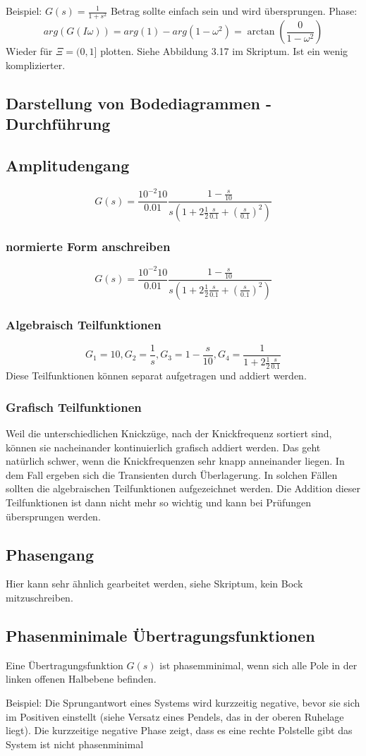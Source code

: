 \documentclass[a4paper]{article}
\begin{document}
Beispiel: $G(s)=\frac{1}{1+s^{2}}$ 
Betrag sollte einfach sein und wird übersprungen.
Phase:
\[ arg(G(I\omega))=arg(1)-arg(1-\omega^{2})=\arctan(\frac{0}{1-\omega^{2}}) \]
Wieder für $\Xi=(0, 1]$ plotten. Siehe Abbildung 3.17 im Skriptum. Ist ein wenig komplizierter.

\subsection*{Darstellung von Bodediagrammen - Durchführung}
\subsection*{Amplitudengang}
\[ G(s)=\frac{10^{-2} 10}{0.01} \frac{1-\frac{s}{10}}{s(1+2 \frac{1}{2} \frac{s}{0.1}+(\frac{s}{0.1})^{2})}\]

\subsubsection*{normierte Form anschreiben}
\[ G(s)=\frac{10^{-2} 10}{0.01} \frac{1-\frac{s}{10}}{s(1+2 \frac{1}{2} \frac{s}{0.1}+(\frac{s}{0.1})^{2})}\]

\subsubsection*{Algebraisch Teilfunktionen}
\[ G_{1}=10, G_{2}=\frac{1}{s}, G_{3}=1-\frac{s}{10}, G_{4}=\frac{1}{1+2 \frac{1}{2} \frac{s}{0.1} }\]
Diese Teilfunktionen können separat aufgetragen und addiert werden.

\subsubsection*{Grafisch Teilfunktionen}
Weil die unterschiedlichen Knickzüge, nach der Knickfrequenz sortiert sind, können sie nacheinander kontinuierlich grafisch addiert werden.
Das geht natürlich schwer, wenn die Knickfrequenzen sehr knapp anneinander liegen. In dem Fall ergeben sich die Transienten durch Überlagerung. In solchen Fällen sollten die algebraischen Teilfunktionen aufgezeichnet werden. Die Addition dieser Teilfunktionen ist dann nicht mehr so wichtig und kann bei Prüfungen übersprungen werden.

\subsection*{Phasengang}
Hier kann sehr ähnlich gearbeitet werden, siehe Skriptum, kein Bock mitzuschreiben.

\subsection*{Phasenminimale Übertragungsfunktionen}
Eine Übertragungsfunktion $G(s)$ ist phasemminimal, wenn sich alle Pole in der linken offenen Halbebene befinden.

Beispiel: Die Sprungantwort eines Systems wird kurzzeitig negative, bevor sie sich im Positiven einstellt (siehe Versatz eines Pendels, das in der oberen Ruhelage liegt). Die kurzzeitige negative Phase zeigt, dass es eine rechte Polstelle gibt \implies das System ist nicht phasenminimal
\end{document}
